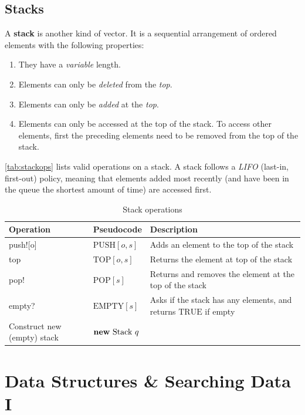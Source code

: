 \subsection{Stacks}
A \textbf{stack} is another kind of vector. It is a sequential arrangement of ordered elements with the following properties:

\begin{enumerate}
	\item They have a \emph{variable} length.
	\item Elements can only be \emph{deleted} from the \emph{top}.
	\item Elements can only be \emph{added} at the \emph{top}.
	\item Elements can only be accessed at the top of the stack. To access other elements, first the preceding elements need to be removed from the top of the stack.
	\end{enumerate}

	\autoref{tab:stackops} lists valid operations on a stack. A stack follows a \emph{LIFO} (last-in, first-out) policy, meaning that elements added most recently (and have been in the queue the shortest amount of time) are accessed first.
\begin{table}[ht]
	\renewcommand{\arraystretch}{2}
	\centering
	\begin{tabular}{@{}ll>{\raggedright\arraybackslash}p{8cm}@{}}
	\toprule
		\textbf{Operation}  & \textbf{Pseudocode}  & \textbf{Description}  \\ \midrule
	push![o] & \( \textrm{PUSH}[o,s] \) & Adds an element to the top of the stack \\
	top & \( \textrm{TOP}[o,s] \) & Returns the element at top of the stack
	\\
	pop! & \( \textrm{POP}[s] \) & Returns and removes the element at the top of the stack\\
	empty? & \( \textrm{EMPTY}[s] \) & Asks if the stack has any elements, and returns \( \textrm{TRUE} \) if empty\\
	Construct new (empty) stack  & \( \textrm{\textbf{new} Stack } q \) & \\ \bottomrule
	\end{tabular}
	\caption{Stack operations}\label{tab:stackops}
	\end{table}

	\section{Data Structures \& Searching Data I}

